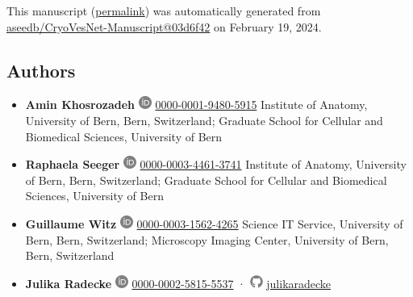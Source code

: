This manuscript
(\href{https://aseedb.github.io/CryoVesNet-Manuscript/v/03d6f425688ef567a0146dacd62db69d970824c1/}{permalink})
was automatically generated
from \href{https://github.com/aseedb/CryoVesNet-Manuscript/tree/03d6f425688ef567a0146dacd62db69d970824c1}{aseedb/CryoVesNet-Manuscript@03d6f42}
on February 19, 2024.

\hypertarget{authors}{%
\subsection{Authors}\label{authors}}

\begin{itemize}
\item
  \textbf{Amin Khosrozadeh}
  \includegraphics[width=0.16667in,height=0.16667in]{images/orcid.svg}
  \href{https://orcid.org/0000-0001-9480-5915}{0000-0001-9480-5915}
  Institute of Anatomy, University of Bern, Bern, Switzerland; Graduate School for Cellular and Biomedical Sciences, University of Bern
\item
  \textbf{Raphaela Seeger}
  \includegraphics[width=0.16667in,height=0.16667in]{images/orcid.svg}
  \href{https://orcid.org/0000-0003-4461-3741}{0000-0003-4461-3741}
  Institute of Anatomy, University of Bern, Bern, Switzerland; Graduate School for Cellular and Biomedical Sciences, University of Bern
\item
  \textbf{Guillaume Witz}
  \includegraphics[width=0.16667in,height=0.16667in]{images/orcid.svg}
  \href{https://orcid.org/0000-0003-1562-4265}{0000-0003-1562-4265}
  Science IT Service, University of Bern, Bern, Switzerland; Microscopy Imaging Center, University of Bern, Bern, Switzerland
\item
  \textbf{Julika Radecke}
  \includegraphics[width=0.16667in,height=0.16667in]{images/orcid.svg}
  \href{https://orcid.org/0000-0002-5815-5537}{0000-0002-5815-5537}
  · \includegraphics[width=0.16667in,height=0.16667in]{images/github.svg}
  \href{https://github.com/julikaradecke}{julikaradecke}

\end{itemize}
